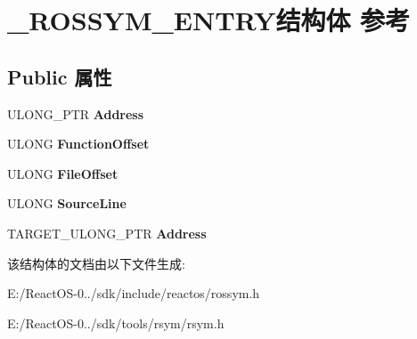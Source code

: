 \hypertarget{struct___r_o_s_s_y_m___e_n_t_r_y}{}\section{\+\_\+\+R\+O\+S\+S\+Y\+M\+\_\+\+E\+N\+T\+R\+Y结构体 参考}
\label{struct___r_o_s_s_y_m___e_n_t_r_y}
\subsection*{Public 属性}
\begin{DoxyCompactItemize}
\item 
\mbox{\label{struct___r_o_s_s_y_m___e_n_t_r_y_a7e1d12e070c5121e6b71ba2474715b37}} 
U\+L\+O\+N\+G\+\_\+\+P\+TR {\bfseries Address}
\item 
\mbox{\label{struct___r_o_s_s_y_m___e_n_t_r_y_aa5183e1ae4b1fe4ae37b59d774132184}} 
U\+L\+O\+NG {\bfseries Function\+Offset}
\item 
\mbox{\label{struct___r_o_s_s_y_m___e_n_t_r_y_a632151641048d059910132f1cd8b88d6}} 
U\+L\+O\+NG {\bfseries File\+Offset}
\item 
\mbox{\label{struct___r_o_s_s_y_m___e_n_t_r_y_a31908d73b32bfeb904fb8813e6b7f08f}} 
U\+L\+O\+NG {\bfseries Source\+Line}
\item 
\mbox{\label{struct___r_o_s_s_y_m___e_n_t_r_y_a7b27752fbc452de92e2ba70e4d9337aa}} 
T\+A\+R\+G\+E\+T\+\_\+\+U\+L\+O\+N\+G\+\_\+\+P\+TR {\bfseries Address}
\end{DoxyCompactItemize}


该结构体的文档由以下文件生成\+:\begin{DoxyCompactItemize}
\item 
E\+:/\+React\+O\+S-\/0../sdk/include/reactos/rossym.\+h\item 
E\+:/\+React\+O\+S-\/0../sdk/tools/rsym/rsym.\+h\end{DoxyCompactItemize}
